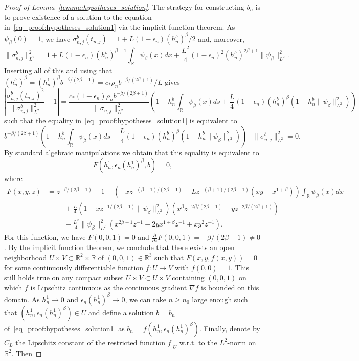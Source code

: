 \documentclass[10.5pt,letter]{article}
\numberwithin{equation}{section}
\theoremstyle{definition}
\newcommand{\R}{\mathbb{R}}
\newcommand{\1}{\mathbbm{1}}
\begin{document}
\begin{proof}[Proof of Lemma~\ref{lemma:hypotheses_solution}]
    The strategy for constructing $b_n$ is to prove existence of a solution to the equation in~\eqref{eq_proof:hypotheses_solution1} via the implicit function theorem.
    As $\psi_\beta(0)=1$, we have $\sigma_{n,j}^b(t_{n,j}) = 1+L(1-\epsilon_n)(h_n^b)^\beta/2$ and, moreover,
    \[ \|\sigma_{n,j}^b\|_{L^2}^2 = 1 + L(1-\epsilon_n) (h_n^b)^{\beta+1}\int_\R \psi_\beta(x)dx + \frac{L^2}{4}(1-\epsilon_n)^2 (h_n^b)^{2\beta+1} \|\psi_\beta\|_{L^2}^2.\]
    Inserting all of this and using that $(h_n^b)^\beta = (h_n^1)^\beta b^{-\beta/(2\beta+1)} = c_*\rho_n b^{-\beta/(2\beta+1)}/L$ gives
    \[ \left|\frac{\sigma_{n,j}^b(t_{n,j})^2}{\|\sigma_{n,j}^b\|_{L^2}^2} -1\right| = \frac{c_*(1-\epsilon_n)\rho_n b^{-\beta/(2\beta+1)}}{\|\sigma_{n,j}\|_{L^2}^2} \left( 1- h_n^b\int_\R \psi_\beta(x)ds + \frac{L}{4}(1-\epsilon_n)(h_n^b)^{\beta}\left(1-h_n^b\|\psi_\beta\|_{L^2}^2\right)\right)\]
    such that the equality in~\eqref{eq_proof:hypotheses_solution1} is equivalent to 
    \[ b^{-\beta/(2\beta+1)}\left( 1- h_n^b\int_\R \psi_\beta(x)ds + \frac{L}{4}(1-\epsilon_n)(h_n^b)^{\beta}\left( 1-h_n^b\|\psi_\beta\|_{L^2}^2\right)\right) - \|\sigma_{n,j}^b\|_{L^2}^2 =0.\]
    By standard algebraic manipulations we obtain that this equality is equivalent to
    \[ F\left(h_n^1,\epsilon_n (h_n^1)^\beta, b \right) =0,\]
    where
    \begin{align*}
        F(x,y,z) &= z^{-\beta/(2\beta+1)} -1 + \left( -xz^{-(\beta+1)/(2\beta+1)} + Lz^{-(\beta+1)/(2\beta+1)} \left(xy-x^{1+\beta}\right) \right) \int_\R \psi_\beta(x)dx \\
        &\hspace{1cm}+ \frac{L}{4}\left( 1-xz^{-1/(2\beta+1)}\|\psi_\beta\|_{L^2}^2\right)\left( x^\beta z^{-2\beta/(2\beta+1)} - yz^{-2\beta/(2\beta+1)}\right)\\
        &\hspace{1cm} -\frac{L^2}{4}\|\psi_\beta\|_{L^2}^2\left( x^{2\beta+1}z^{-1} - 2yx^{1+\beta}z^{-1} + xy^2z^{-1}\right).
    \end{align*}
    For this function, we have $F(0,0,1)=0$ and $\frac{\partial}{\partial z}F(0,0,1)=-\beta/(2\beta+1)\neq 0$. By the implicit function theorem, we conclude that there exists an open neighborhood $U\times V\subset\R^2\times \R$ of $(0,0,1)\in\R^3$ such that $F(x,y,f(x,y))=0$ for some continuously differentiable function $f:U\rightarrow V$ with $f(0,0)=1$. This still holds true on any compact subset $\overline{U}\times \overline{V}\subset U\times V$ containing $(0,0,1)$ on which $f$ is Lipschitz continuous as the continuous gradient $\nabla f$ is bounded on this domain. As $h_n^1\rightarrow 0$ and $\epsilon_n (h_n^1)^\beta\rightarrow 0$, we can take $n\geq n_0$ large enough such that $(h_n^1, \epsilon_n(h_n^1)^\beta)\in \overline{U}$ and define a solution $b=b_n$ of~\eqref{eq_proof:hypotheses_solution1} as $b_n=f(h_n^1,\epsilon_n (h_n^1)^\beta)$. Finally, denote by $C_L$ the Lipschitz constant of the restricted function $f|_{\overline{U}}$ w.r.t. to the $L^2$-norm on $\R^2$. Then

\end{proof}
\end{document}
